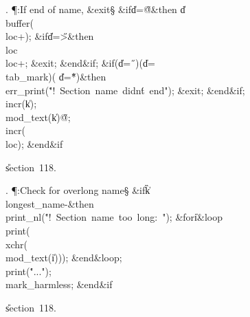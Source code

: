 . \P\?:If end of name, \&{exit}\X\S\?\6
\&{if}\1\1\8\|d\?=\?\H{@}\2\8\&{then}\6
\|d\?\K\?\\{buffer}\?\1(\?\\{loc}\?+\?\2)\?;\6
\&{if}\1\1\8\|d\?=\?\H{>}\2\8\&{then}\6
\\{loc}\?\K\?\\{loc}\?+;\6
\&{exit};\2\6
\&{end}\8\2\&{if}\1;\6
\&{if}\1\1\?\8\1(\?\|d\?=\?\H{\ }\?\2)\V\1(\?\|d\?=\?\\{tab\_mark}\?\2)\V\1(\?%
\|d\?=\?\H{*}\?\2)\?\2\8\&{then}\6
\\{err\_print}\?\1(\?\.{"!\ Section\ name\ didn\'t\ end"}\?\2)\?;\6
\&{exit};\2\6
\&{end}\8\2\&{if}\1;\6
\\{incr}\?\1(\?\|k\?\2)\?;\5
\\{mod\_text}\?\1(\?\|k\?\2)\K\?\H{@};\5
\\{incr}\?\1(\?\\{loc}\?\2)\?;%
\2\6
\&{end}\8\2\&{if}\1\par
\U section~118.\fi

. \P\?:Check for overlong name\X\S\?\6
\&{if}\1\1\8\|k\?\G\?\\{longest\_name}\?-\2\8\&{then}\6
\\{print\_nl}\?\1(\?\.{"!\ Section\ name\ too\ long:\ "}\?\2)\?;\6
\1\&{for}\8\|i\?\in{}\?\to{}\8\&{loop}\6
\\{print}\?\1(\?\\{xchr}\?\1(\?\\{mod\_text}\?\1(\?\|i\?\2)\2)\2)\?;\2\6
\&{end}\8\&{loop};\6
\\{print}\?\1(\?\.{"..."}\?\2)\?;\5
\\{mark\_harmless};\2\6
\&{end}\8\2\&{if}\1\par
\U section~118.\fi

